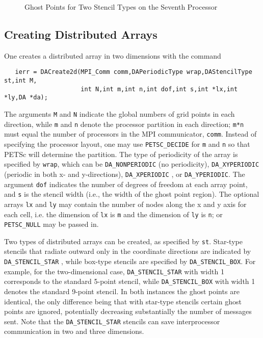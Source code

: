 \begin{figure}[tb]
\centerline{}
\caption{Ghost Points for Two Stencil Types on the Seventh Processor}
\label{fig:ghosts}
\end{figure}

\subsection{Creating Distributed Arrays}

One creates a distributed array in two dimensions with the command 
\begin{verbatim}
   ierr = DACreate2d(MPI_Comm comm,DAPeriodicType wrap,DAStencilType st,int M,
                     int N,int m,int n,int dof,int s,int *lx,int *ly,DA *da);
\end{verbatim}
The   arguments
 {\tt M} and {\tt N} indicate the global
numbers of grid points in each direction, while {\tt m} and {\tt n}
denote the processor partition in each direction; {\tt m*n} must equal
the number of processors in the MPI communicator, {\tt comm}.  
Instead of specifying the processor layout, one may use
{\tt PETSC\_DECIDE} for {\tt m} and {\tt n} 
so that PETSc will determine the partition. The type of
periodicity of the array is specified by {\tt wrap}, which can be 
{\tt DA\_NONPERIODIC}  (no periodicity), 
{\tt DA\_XYPERIODIC}  (periodic in
both x- and y-directions), {\tt DA\_XPERIODIC} , 
or {\tt DA\_YPERIODIC}.  The argument {\tt dof} 
indicates the number of degrees of freedom at each array point,
and {\tt s} is the stencil width (i.e., the width of the ghost point region).
The optional arrays {\tt lx} and {\tt ly} may contain the number of nodes
along the x and y axis for each cell, i.e. the dimension of {\tt lx} is
{\tt m} and the dimension of {\tt ly} is {\tt n}; or {\tt PETSC\_NULL} 
may be passed in.

Two types of distributed arrays can be created, as specified by {\tt st}.
Star-type stencils that radiate outward only in the coordinate
directions are indicated by {\tt DA\_STENCIL\_STAR}
, while box-type stencils are specified by
{\tt DA\_STENCIL\_BOX}.  For example, for the
two-dimensional case,
{\tt DA\_STENCIL\_STAR} with width 1 corresponds to the standard 5-point
stencil, while {\tt DA\_STENCIL\_BOX} with width 1 denotes the
standard 9-point stencil.  In both instances the ghost points are
identical, the only difference being that with star-type stencils
certain ghost points are ignored, potentially decreasing substantially
the number of messages sent.  Note that the {\tt DA\_STENCIL\_STAR}
stencils can save interprocessor communication in two and three
dimensions.

